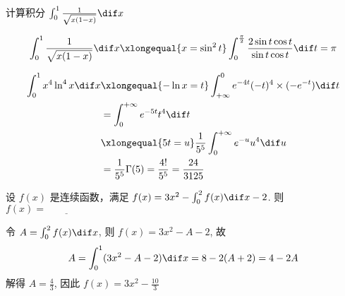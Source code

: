 \documentclass[color=green,titlestyle=hang]{elegantbook}%
\begin{document}
\begin{example}
计算积分 $\int_{0}^{1}\frac{1}{\sqrt{x(1-x)}}\dif x$
\end{example}\begin{solution}
\[\int_{0}^{1}\frac{1}{\sqrt{x(1-x)}}\dif x\xlongequal{x=\sin^2t}\int_{0}^{\frac{\pi}{2}}\frac{2\sin t\cos t}{\sin t\cos t}\dif t=\pi\]
\end{solution}

\begin{align*}
\int_0^1x^4\ln^4x\dif x
&\xlongequal{-\ln x=t}\int_{+\infty}^0e^{-4t}(-t)^4\times(-e^{-t})\dif  t\\
&=\int_0^{+\infty}e^{-5t}t^4\dif  t\\
&\xlongequal{5t=u}\frac{1}{5^5}\int_0^{+\infty}e^{-u}u^4\dif  u\\
&=\frac{1}{5^5}\Gamma(5)=\frac{4!}{5^5}=\frac{24}{3125}
\end{align*}

\begin{example}
设 $f(x)$ 是连续函数，满足 $f(x)=3x^2-\int_0^2f(x)\dif x-2$. 则 $f(x)=\underline{\qquad\qquad}$
\end{example}
\begin{solution}
令 $A=\int_0^2f(x)\dif x$, 则 $f(x)=3x^2-A-2$, 故
\[A=\int_0^1(3x^2-A-2)\dif x=8-2(A+2)=4-2A\]
解得 $A=\frac{4}{3}$, 因此 $f(x)=3x^2-\frac{10}{3}$	
\end{solution}
\end{document}

